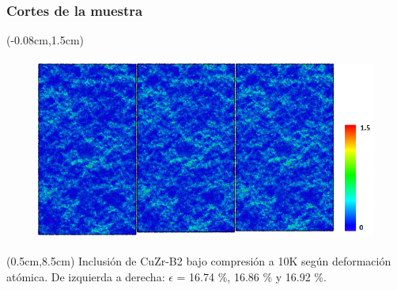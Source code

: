 \begin{frame}
  \frametitle{Cortes de la muestra}
  \begin{textblock*}{12.6cm}(-0.08cm,1.5cm) 
    \begin{figure}[htp]
     \centering
     \includegraphics[height=6cm]{../Presentacion/Nanoparticles/B2SphereCompression_10K_Snapshots.png}
    \end{figure}
  \end{textblock*}
  \begin{textblock*}{12cm}(0.5cm,8.5cm) 
    \centering
      \small{Inclusión de CuZr-B2 bajo compresión a 10K según deformación atómica. De izquierda a derecha: $\epsilon$ = 16.74 \%, 16.86 \% y 16.92 \%.}
    \end{textblock*}
\end{frame}

